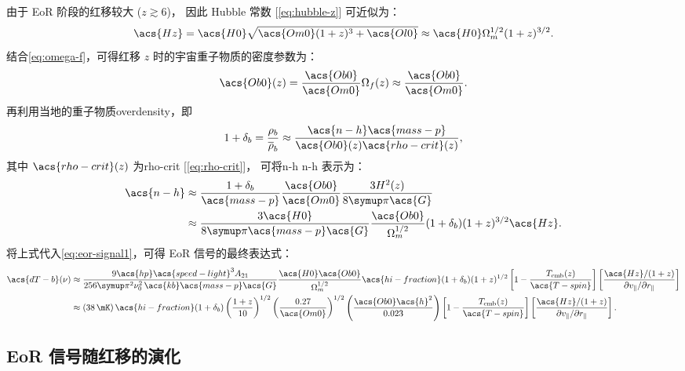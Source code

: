 由于 EoR 阶段的红移较大 ($z \gtrsim 6$)，
因此 Hubble 常数 [\autoref{eq:hubble-z}] 可近似为：
\begin{equation}
  \acs{Hz} = \acs{H0} \sqrt{\acs{Om0} (1+z)^3 + \acs{Ol0}}
    \approx \acs{H0} \Omega_m^{1/2} (1+z)^{3/2} .
\end{equation}
结合\autoref{eq:omega-f}，可得红移 $z$ 时的宇宙重子物质的密度参数为：
\begin{equation}
  \acs{Ob0}(z) = \frac{\acs{Ob0}}{\acs{Om0}} \Omega_f(z)
    \approx \frac{\acs{Ob0}}{\acs{Om0}} .
\end{equation}
再利用当地的重子物质\ac{overdensity}，即
\begin{equation}
  1 + \delta_b = \frac{\rho_b}{\overline{\rho}_b}
    \approx \frac{\acs{n-h} \acs{mass-p}}{\acs{Ob0}(z) \acs{rho-crit}(z)} ,
\end{equation}
其中 $\acs{rho-crit}(z)$ 为\acl{rho-crit} [\autoref{eq:rho-crit}]，
可将\acl{n-h} \acs{n-h} 表示为：
\begin{align}
  \acs{n-h}
    & \approx \frac{1+\delta_b}{\acs{mass-p}} \frac{\acs{Ob0}}{\acs{Om0}}
      \frac{3 H^2(z)}{8 \Cpi \acs{G}}  \\
    & \approx \frac{3 \acs{H0}}{8\Cpi\acs{mass-p}\acs{G}}
      \frac{\acs{Ob0}}{\Omega_m^{1/2}} (1+\delta_b) (1+z)^{3/2} \acs{Hz} .
\end{align}
将上式代入\autoref{eq:eor-signal1}，可得 EoR 信号的最终表达式：
\begin{align}
  \acs{dT-b}(\nu)
    & \approx \frac{9 \acs{hp} \acs{speed-light}^3 A_{21}}{
      256\Cpi^2 \nu_0^2 \,\acs{kb} \acs{mass-p} \acs{G}}
      \frac{\acs{H0} \acs{Ob0}}{\Omega_m^{1/2}}
      \acs{hi-fraction} (1+\delta_b) (1+z)^{1/2}
      \left[ 1 - \frac{T_{\R{cmb}}(z)}{\acs{T-spin}} \right]
      \left[ \frac{\acs{Hz} / (1+z)}{
        \partial v_{\parallel} / \partial r_{\parallel}} \right]
  \label{eq:eor-signal2}  \\
    & \approx \left( \SI{38}{\mK} \right)
      \acs{hi-fraction} (1+\delta_b)
      \left( \frac{1+z}{10} \right)^{1/2}
      \left( \frac{0.27}{\acs{Om0}} \right)^{1/2}
      \left( \frac{\acs{Ob0} \acs{h}^2}{0.023} \right)
      \left[ 1 - \frac{T_{\R{cmb}}(z)}{\acs{T-spin}} \right]
      \left[ \frac{\acs{Hz} / (1+z)}{
        \partial v_{\parallel} / \partial r_{\parallel}} \right] .
  \label{eq:eor-signal3}
\end{align}

\subsection{EoR 信号随红移的演化}

